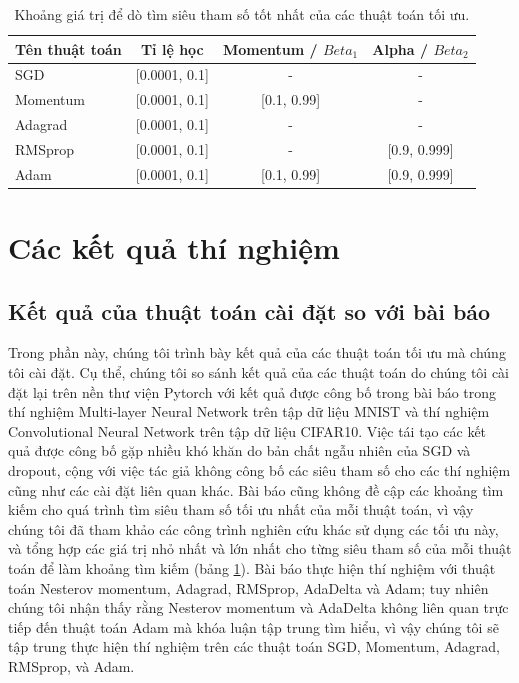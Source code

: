 \begin{center}
	\begin{table}
		\begin{tabular}{|l|c|c|c|}
			\hline
			Tên thuật toán & Tỉ lệ học & Momentum / $Beta_1$ & Alpha / $Beta_2$ \\
			\hline
			SGD & [0.0001, 0.1] & - & - \\
			\hline
			Momentum & [0.0001, 0.1] & [0.1, 0.99] & - \\
			\hline
			Adagrad & [0.0001, 0.1] & - & - \\
			\hline
			RMSprop & [0.0001, 0.1] & - & [0.9, 0.999] \\
			\hline
			Adam & [0.0001, 0.1] & [0.1, 0.99] & [0.9, 0.999] \\
			\hline
		\end{tabular}
	\caption{\label{tab:hparam-search}Khoảng giá trị để dò tìm siêu tham số tốt nhất của các thuật toán tối ưu.}
	\end{table}
\end{center}

\section{Các kết quả thí nghiệm}

\subsection{Kết quả của thuật toán cài đặt so với bài báo}

Trong phần này, chúng tôi trình bày kết quả của các thuật toán tối ưu mà chúng tôi cài đặt. Cụ thể, chúng tôi so sánh kết quả của các thuật toán do chúng tôi cài đặt lại trên nền thư viện Pytorch với kết quả được công bố trong bài báo trong thí nghiệm Multi-layer Neural Network trên tập dữ liệu MNIST và thí nghiệm Convolutional Neural Network trên tập dữ liệu CIFAR10. Việc tái tạo các kết quả được công bố gặp nhiều khó khăn do bản chất ngẫu nhiên của SGD và dropout, cộng với việc tác giả không công bố các siêu tham số cho các thí nghiệm cũng như các cài đặt liên quan khác. Bài báo cũng không đề cập các khoảng tìm kiếm cho quá trình tìm siêu tham số tối ưu nhất của mỗi thuật toán, vì vậy chúng tôi đã tham khảo các công trình nghiên cứu khác sử dụng các tối ưu này, và tổng hợp các giá trị nhỏ nhất và lớn nhất cho từng siêu tham số của mỗi thuật toán để làm khoảng tìm kiếm (bảng \ref{tab:hparam-search}). Bài báo thực hiện thí nghiệm với thuật toán Nesterov momentum, Adagrad, RMSprop, AdaDelta và Adam; tuy nhiên chúng tôi nhận thấy rằng Nesterov momentum và AdaDelta không liên quan trực tiếp đến thuật toán Adam mà khóa luận tập trung tìm hiểu, vì vậy chúng tôi sẽ tập trung thực hiện thí nghiệm trên các thuật toán SGD, Momentum, Adagrad, RMSprop, và Adam.


